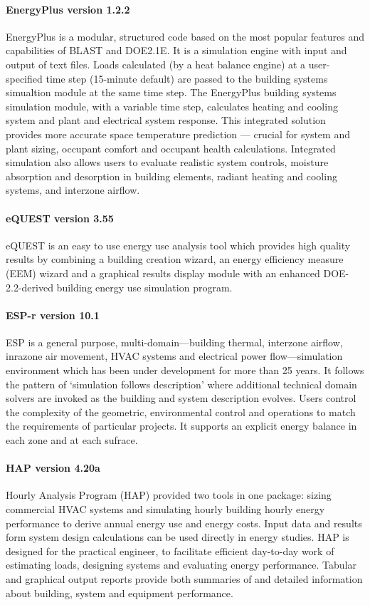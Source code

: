 \paragraph{EnergyPlus version 1.2.2} EnergyPlus is a modular, structured code based on the most popular features and capabilities of BLAST and DOE2.1E. It is a simulation engine with input and output of text files. Loads calculated (by a heat balance engine) at a user-specified time step (15-minute default) are passed to the building systems simualtion module at the same time step. The EnergyPlus building systems simulation module, with a variable time step, calculates heating and cooling system and plant and electrical system response. This integrated solution provides more accurate space temperature prediction --- crucial for system and plant sizing, occupant comfort and occupant health calculations. Integrated simulation also allows users to evaluate realistic system controls, moisture absorption and desorption in building elements, radiant heating and cooling systems, and interzone airflow. \label{par:EnergyPlus}

\paragraph{eQUEST version 3.55} eQUEST is an easy to use energy use analysis tool which provides high quality results by combining a building creation wizard, an energy efficiency measure (EEM) wizard and a graphical results display module with an enhanced DOE-2.2-derived building energy use simulation program.

\paragraph{ESP-r version 10.1} ESP is a general purpose, multi-domain---building thermal, interzone airflow, inrazone air movement, HVAC systems and electrical power flow---simulation environment which has been under development for more than 25 years. It follows the pattern of `simulation follows description' where additional technical domain solvers are invoked as the building and system description evolves. Users control the complexity of the geometric, environmental control and operations to match the requirements of particular projects. It supports an explicit energy balance in each zone and at each sufrace.

\paragraph{HAP version 4.20a} Hourly Analysis Program (HAP) provided two tools in one package: sizing commercial HVAC systems and simulating hourly building hourly energy performance to derive annual energy use and energy costs. Input data and results form system design calculations can be used directly in energy studies. HAP is designed for the practical engineer, to facilitate efficient day-to-day work of estimating loads, designing systems and evaluating energy performance. Tabular and graphical output reports provide both summaries of and detailed information about building, system and equipment performance.

